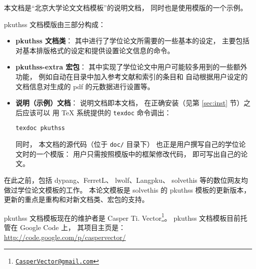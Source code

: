 

本文档是“北京大学论文文档模板”的说明文档，
同时也是使用模版的一个示例。

pkuthss 文档模版由三部分构成：
\begin{itemize}
	\item \textbf{pkuthss 文档类}：
		其中进行了学位论文所需要的一些基本的设定，
		主要包括对基本排版格式的设定和提供设置论文信息的命令。
	\item \textbf{pkuthss-extra 宏包}：
		其中实现了学位论文中用户可能较多用到的一些额外功能，
		例如自动在目录中加入参考文献和索引的条目和%
		自动根据用户设定的文档信息对生成的 pdf 的元数据进行设置等。
	\item \textbf{说明（示例）文档}：
		说明文档即本文档，
		在正确安装（见第 \ref{sec:inst} 节）之后应该可以%
		用 \TeX{} 系统提供的 \verb|texdoc| 命令调出：
\begin{Verbatim}[frame=single]
texdoc pkuthss
\end{Verbatim}
		同时，
		本文档的源代码（位于 \verb|doc/| 目录下）%
		也正是用户撰写自己的学位论文时的一个模版：
		用户只需按照模版中的框架修改代码，
		即可写出自己的论文。
\end{itemize}

在此之前，包括 dypang\cite{dypang}、FerretL\cite{FerretL}、%
lwolf\cite{lwolf}、Langpku\cite{Langpku}、%
solvethis\cite{solvethis} 等的数位网友均做过学位论文模板的工作。
本论文模板是 solvethis 的 pkuthss 模板的更新版本，
更新的重点是重构和对新文档类、宏包的支持。

pkuthss 文档模板现在的维护者是 Casper Ti. Vector\footnote%
{\href{mailto:CasperVector@gmail.com}{\texttt{CasperVector@gmail.com}}}。%
pkuthss 文档模板目前托管在 Google Code 上，
其项目主页是：\\
\hspace*{\parindent}\url{http://code.google.com/p/caspervector/}

